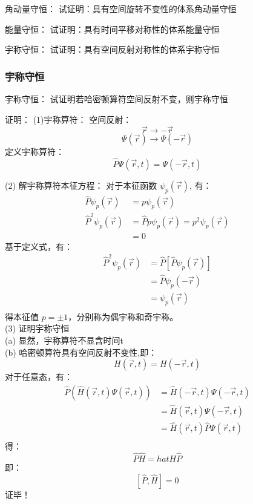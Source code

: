 \begin{frame} [allowframebreaks=]
    \frametitle{} 
    \begin{tcolorbox2}{角动量守恒：}
        试证明：具有空间旋转不变性的体系角动量守恒                               
    \end{tcolorbox2}
    \begin{tcolorbox2}{能量守恒：}
        试证明：具有时间平移对称性的体系能量守恒                               
    \end{tcolorbox2}
    \begin{tcolorbox2}{宇称守恒：}
        试证明：具有空间反射对称性的体系宇称守恒                             
    \end{tcolorbox2}
\end{frame}

\begin{frame} [allowframebreaks=]
    \frametitle{宇称守恒} 
    \begin{tcolorbox1}{宇称守恒：}
        试证明若哈密顿算符空间反射不变，则宇称守恒                               
    \end{tcolorbox1}
    \alert{证明：} (1)宇称算符：
    空间反射：$$\vec{r} \to -\vec{r} $$
    $$\Psi(\vec{r}) \to \Psi(-\vec{r}) $$
    定义宇称算符： $$ \hat{P}\Psi(\vec{r},t) = \Psi(-\vec{r},t) $$
    
    (2) 解宇称算符本征方程： 
    对于本征函数 $\psi_p (\vec{r})$, 有：
    $$\begin{aligned}
        \hat{P}\psi_p (\vec{r}) &= p\psi_p (\vec{r}) \\
        \hat{P}^2\psi_p (\vec{r}) &= \hat{P} p\psi_p (\vec{r}) = p^2\psi_p (\vec{r})\\
        &= 0
    \end{aligned}$$
    基于定义式，有：
    $$\begin{aligned}
        \hat{P}^2\psi_p (\vec{r}) &= \hat{P} [\hat{P} \psi_p (\vec{r})]\\
        &= \hat{P} \psi_p (-\vec{r})\\
        &= \psi_p (\vec{r})\\
    \end{aligned}$$
    得本征值 $p=\pm 1$，分别称为偶宇称和奇宇称。\\
    (3) 证明宇称守恒 \\
    (a) 显然，宇称算符不显含时间t\\
    (b) 哈密顿算符具有空间反射不变性,即：
    $$ H(\vec{r},t)= H(-\vec{r},t)$$
    对于任意态，有：
    $$\begin{aligned}
        \hat{P} (\hat{H}(\vec{r},t) \Psi (\vec{r},t)) &= \hat{H}(-\vec{r},t) \Psi (-\vec{r},t)\\
        &= \hat{H}(\vec{r},t) \Psi (-\vec{r},t)\\
        &= \hat{H}(\vec{r},t) \hat{P} \Psi (\vec{r},t)\\
    \end{aligned}$$
    得： $$ \hat{P} \hat{H} = hat{H} \hat{P} $$
    即：$$[\hat{P}, \hat{H}]=0$$
    证毕！
\end{frame}

